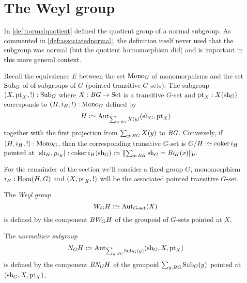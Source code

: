 \section{The Weyl group}
\label{sec:Weyl}

In \cref{def:normalquotient} defined the quotient group of a normal subgroup.
As commented in \cref{def:associatednormal}, the definition itself never used that the subgroup was normal (but the quotient homomorphism did) and is important in this more general context.

Recall the equivalence $E$ between the set $\mathrm{Mono}_G$ of monomorphisms and the set $\mathrm{Sub}_G$ of of subgroups of $G$ (pointed transitive $G$-sets): The subgroup $(X,\mathrm{pt}_X,!):\mathrm{Sub}_G$ where $X:\mathit{B}\mathit{G}\to\mathrm{Set}$ is a transitive $G$-set and $\mathrm{pt}_X:X(\mathrm{sh}_G)$ corresponds to $(H,i_H,!):\mathrm{Mono}_G$ defined by
$$H\defequi\aut_{\sum_{y:\BG}X(y)}(\shape_G,\pt_X)
$$ together with the first projection from $\sum_{y:\mathit{B}\mathit{G}}X(y)$ to $\mathit{B}\mathit{G}$.  Conversely, if $(H,i_H,!):\mathrm{Mono}_G$, then the corresponding transitive $G$-set is $G/H\defequi\coker i_H$ pointed at $|\shape_H,p_{i_H}|:\coker i_H(\shape_G)\defequi\Trunc{\sum_{x:\BH}\shape_G=\Bi_H(x)}_0$.

For the remainder of the section we'll consider a fixed group $G$, monomorphism $i_H:\Hom(H,G)$ and $(X,\mathrm{pt}_X,!)$ will be the associated pointed transitive $G$-set.
\begin{definition}

The \emph{Weyl group} \label{def:Weyl}
$$W_GH\defequi\Aut_{G\text{-set}}(X)$$ is defined by the component $\mathit{B}\mathit{W}_GH$ of the groupoid of $G$-sets pointed at $X$.

The \emph{normalizer subgroup} \label{def:normalizer}
$$N_GH\defequi\Aut_{\sum_{y:\BG}\typesubgroup_G(y)}(\shape_G,X,\pt_X)$$ is defined by the component $\mathit{B}\mathit{N}_GH$ of the groupoid $\sum_{y:\mathit{B}\mathit{G}}\mathrm{Sub}_G(y)$ pointed at $(\mathrm{sh}_G,X,\mathrm{pt}_X)$.
\end{definition}

